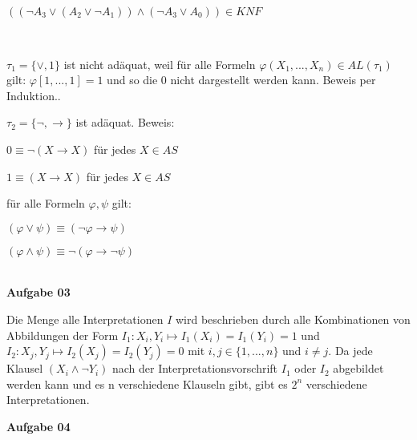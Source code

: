 \documentclass[a4paper,10pt]{article}
\begin{document}
\begin{compactenum} [(a)]
\begin{compactitem}
\begin{tabbing}
				\> $ ((\lnot A_3 \vee (A_2 \vee \lnot A_1))\wedge (\lnot A_3 \vee A_0))  \in KNF $
			\end{tabbing}
		\end{compactitem}\
		\item \begin{compactitem}
			\item $ \tau_1 = \{\vee, 1\} $ ist nicht adäquat, weil für alle Formeln $ \varphi(X_1,...,X_n) \in AL(\tau_1) $ gilt: $ \varphi[1,...,1] = 1 $ und so die 0 nicht dargestellt werden kann. Beweis per Induktion.. 
			\item $ \tau_2 = \{\lnot, \rightarrow\} $ ist adäquat. Beweis:
			\begin{compactitem}
				\item $ 0 \equiv \lnot (X \rightarrow X) $  für jedes $ X \in AS $
				\item $ 1 \equiv (X \rightarrow X) $ für jedes $ X \in AS $
				\item für alle Formeln $ \varphi , \psi $ gilt:
				\begin{compactitem}
					\item $ (\varphi \vee \psi) \equiv (\lnot \varphi \rightarrow \psi) $
					\item $ (\varphi \wedge \psi) \equiv \lnot (\varphi \rightarrow \lnot \psi) $
				\end{compactitem}
			\end{compactitem}
		\end{compactitem}
	\end{compactenum} \
	\\
	\textbf{Aufgabe 03}
	\begin{compactenum} [(a)]
		\item Die Menge alle Interpretationen $ I $ wird beschrieben durch alle Kombinationen von Abbildungen der Form $ I_1: X_i, Y_i \longmapsto I_1(X_i) = I_1(Y_i) = 1 $ und $ I_2 : X_j, Y_j \longmapsto I_2(X_j) = I_2(Y_j) = 0 $ mit $ i,j \in \{1,...,n\} $ und $ i\neq j$. Da jede Klausel $ (X_i \wedge \lnot Y_i) $ nach der Interpretationsvorschrift $ I_1 $ oder $ I_2 $ abgebildet werden kann und es n verschiedene Klauseln gibt, gibt es $ 2^n $ verschiedene Interpretationen.
		\item 
		\item 
	\end{compactenum}
	\newpage
	\textbf{Aufgabe 04}\
\end{document}
